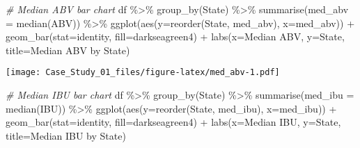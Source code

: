 \documentclass[
]{article}
\newenvironment{Shaded}{\begin{snugshade}}{\end{snugshade}}
\newcommand{\AttributeTok}[1]{\textcolor[rgb]{0.77,0.63,0.00}{#1}}
\newcommand{\CommentTok}[1]{\textcolor[rgb]{0.56,0.35,0.01}{\textit{#1}}}
\newcommand{\FunctionTok}[1]{\textcolor[rgb]{0.00,0.00,0.00}{#1}}
\newcommand{\NormalTok}[1]{#1}
\newcommand{\SpecialCharTok}[1]{\textcolor[rgb]{0.00,0.00,0.00}{#1}}
\newcommand{\StringTok}[1]{\textcolor[rgb]{0.31,0.60,0.02}{#1}}
\begin{document}
\begin{Shaded}
\begin{Highlighting}[]
\CommentTok{\# Median ABV bar chart}
\NormalTok{df }\SpecialCharTok{\%\textgreater{}\%} \FunctionTok{group\_by}\NormalTok{(State) }\SpecialCharTok{\%\textgreater{}\%} 
  \FunctionTok{summarise}\NormalTok{(}\AttributeTok{med\_abv =} \FunctionTok{median}\NormalTok{(ABV)) }\SpecialCharTok{\%\textgreater{}\%}
  \FunctionTok{ggplot}\NormalTok{(}\FunctionTok{aes}\NormalTok{(}\AttributeTok{y=}\FunctionTok{reorder}\NormalTok{(State, med\_abv), }\AttributeTok{x=}\NormalTok{med\_abv)) }\SpecialCharTok{+} 
  \FunctionTok{geom\_bar}\NormalTok{(}\AttributeTok{stat=}\StringTok{\textquotesingle{}identity\textquotesingle{}}\NormalTok{, }\AttributeTok{fill=}\StringTok{\textquotesingle{}darkseagreen4\textquotesingle{}}\NormalTok{) }\SpecialCharTok{+}
  \FunctionTok{labs}\NormalTok{(}\AttributeTok{x=}\StringTok{\textquotesingle{}Median ABV\textquotesingle{}}\NormalTok{, }\AttributeTok{y=}\StringTok{\textquotesingle{}State\textquotesingle{}}\NormalTok{, }\AttributeTok{title=}\StringTok{\textquotesingle{}Median ABV by State\textquotesingle{}}\NormalTok{)}
\end{Highlighting}
\end{Shaded}

\texttt{[image: Case\_Study\_01\_files/figure-latex/med\_abv-1.pdf]}

\begin{Shaded}
\begin{Highlighting}[]
\CommentTok{\# Median IBU bar chart}
\NormalTok{df }\SpecialCharTok{\%\textgreater{}\%} \FunctionTok{group\_by}\NormalTok{(State) }\SpecialCharTok{\%\textgreater{}\%}
  \FunctionTok{summarise}\NormalTok{(}\AttributeTok{med\_ibu =} \FunctionTok{median}\NormalTok{(IBU)) }\SpecialCharTok{\%\textgreater{}\%}
  \FunctionTok{ggplot}\NormalTok{(}\FunctionTok{aes}\NormalTok{(}\AttributeTok{y=}\FunctionTok{reorder}\NormalTok{(State, med\_ibu), }\AttributeTok{x=}\NormalTok{med\_ibu)) }\SpecialCharTok{+} 
  \FunctionTok{geom\_bar}\NormalTok{(}\AttributeTok{stat=}\StringTok{\textquotesingle{}identity\textquotesingle{}}\NormalTok{, }\AttributeTok{fill=}\StringTok{\textquotesingle{}darkseagreen4\textquotesingle{}}\NormalTok{) }\SpecialCharTok{+}
  \FunctionTok{labs}\NormalTok{(}\AttributeTok{x=}\StringTok{\textquotesingle{}Median IBU\textquotesingle{}}\NormalTok{, }\AttributeTok{y=}\StringTok{\textquotesingle{}State\textquotesingle{}}\NormalTok{, }\AttributeTok{title=}\StringTok{\textquotesingle{}Median IBU by State\textquotesingle{}}\NormalTok{)}
\end{Highlighting}
\end{Shaded}
\end{document}
